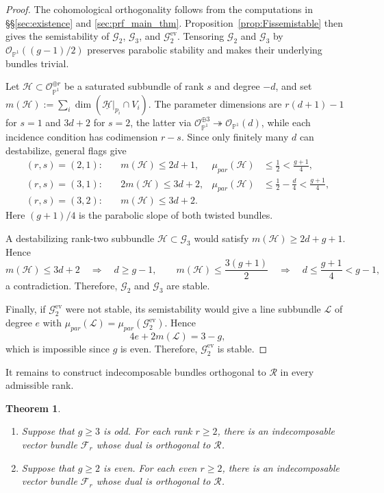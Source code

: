 \documentclass[12pt, letterpaper]{amsart}
\newtheorem{theorem}{Theorem}[section]
\theoremstyle{definition}
\newcommand{\PP}{\mathbb{P} }
\newcommand{\cF}{\mathcal{F} }
\newcommand{\cG}{\mathcal{G} }
\newcommand{\cH}{\mathcal{H} }
\newcommand{\cL}{\mathcal{L} }
\newcommand{\cO}{\mathcal{O} }
\newcommand{\cR}{\mathcal{R} }
\newcommand{\parmu}{\mu_{par}}
\begin{document}
\begin{proof}
The cohomological orthogonality follows from the computations in \S\S\ref{sec:existence} and \ref{sec:prf_main_thm}. Proposition~\ref{prop:Fissemistable} then gives the semistability of \(\cG_2\), \(\cG_3\), and \(\cG_2^{\mathrm{ev}}\). Tensoring \(\cG_2\) and \(\cG_3\) by \(\cO_{\PP^1}((g-1)/2)\) preserves parabolic stability and makes their underlying bundles trivial.

Let \(\cH\subset\cO_{\PP^1}^{\oplus r}\) be a saturated subbundle of rank \(s\) and degree \(-d\), and set \(m(\cH):=\sum_i\dim(\underline{\cH}|_{p_i}\cap V_i)\). The parameter dimensions are \(r(d+1)-1\) for \(s=1\) and \(3d+2\) for \(s=2\), the latter via \(\cO_{\PP^1}^{\oplus3}\twoheadrightarrow\cO_{\PP^1}(d)\), while each incidence condition has codimension \(r-s\). Since only finitely many \(d\) can destabilize, general flags give
\begin{align*}
(r,s)=(2,1):\quad &m(\cH)\le2d+1, &\parmu(\cH)&\le\frac12<\frac{g+1}{4},\\
(r,s)=(3,1):\quad &2m(\cH)\le3d+2, &\parmu(\cH)&\le\frac12-\frac d4<\frac{g+1}{4},\\
(r,s)=(3,2):\quad &m(\cH)\le3d+2. &&
\end{align*}
Here \((g+1)/4\) is the parabolic slope of both twisted bundles.

A destabilizing rank-two subbundle \(\cH\subset\cG_3\) would satisfy \(m(\cH)\ge2d+g+1\). Hence
\[m(\cH)\le3d+2\quad\Longrightarrow\quad d\ge g-1,\qquad m(\cH)\le\frac{3(g+1)}2\quad\Longrightarrow\quad d\le\frac{g+1}{4}<g-1,\]
a contradiction. Therefore, \(\cG_2\) and \(\cG_3\) are stable.

Finally, if \(\cG_2^{\mathrm{ev}}\) were not stable, its semistability would give a line subbundle \(\cL\) of degree \(e\) with \(\parmu(\cL)=\parmu(\cG_2^{\mathrm{ev}})\). Hence
\[4e+2m(\cL)=3-g,\]
which is impossible since \(g\) is even. Therefore, \(\cG_2^{\mathrm{ev}}\) is stable.
\end{proof}

It remains to construct indecomposable bundles orthogonal to \(\cR\) in every admissible rank.

\begin{theorem}\label{thm:maintheoremoddconditional}
\begin{enumerate}
  \item Suppose that \(g \ge 3\) is odd. For each rank \(r \ge 2\), there is an indecomposable vector bundle \(\cF_r\) whose dual is orthogonal to \(\cR\).
  \item Suppose that \(g \ge 2\) is even. For each even \(r \ge 2\), there is an indecomposable vector bundle \(\cF_r\) whose dual is orthogonal to \(\cR\).
\end{enumerate}
\end{theorem}
\end{document}
